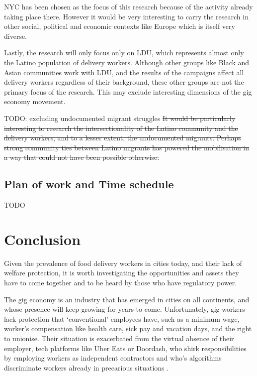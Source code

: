 \documentclass{article}
\begin{document}
NYC has been chosen as the focus of this research because of the activity already taking place there. However it would be very interesting to carry the research in other social, political and economic contexts like Europe which is itself very diverse.

Lastly, the research will only focus only on LDU, which represents almost only the Latino population of delivery workers. Although other groups like Black and Asian communities work with LDU, and the results of the campaigns affect all delivery workers regardless of their background, these other groups are not the primary focus of the research. This may exclude interesting dimensions of the gig economy movement. 

TODO: excluding undocumented migrant struggles \sout{It would be particularly interesting to research the intersectionality of the Latino community and the delivery workers, and to a lesser extent, the undocumented migrants. Perhaps strong community ties between Latino migrants has powered the mobilisation in a way that could not have been possible otherwise.}

\subsection{Plan of work and Time schedule}

TODO


\section{Conclusion}

Given the prevalence of food delivery workers in cities today, and their lack of welfare protection, it is worth investigating the opportunities and assets they have to come together and to be heard by those who have regulatory power.

The gig economy is an industry that has emerged in cities on all continents, and whose presence will keep growing for years to come. Unfortunately, gig workers lack protection that `conventional’ employees have, such as a minimum wage, worker’s compensation like health care, sick pay and vacation days, and the right to unionise. Their situation is exacerbated from the virtual absence of their employer, tech platforms like Uber Eats or Doordash, who shirk responsibilities by employing workers as independent contractors and who’s algorithms discriminate workers already in precarious situations \parencite{kellogg2020algorithms}.
\end{document}
